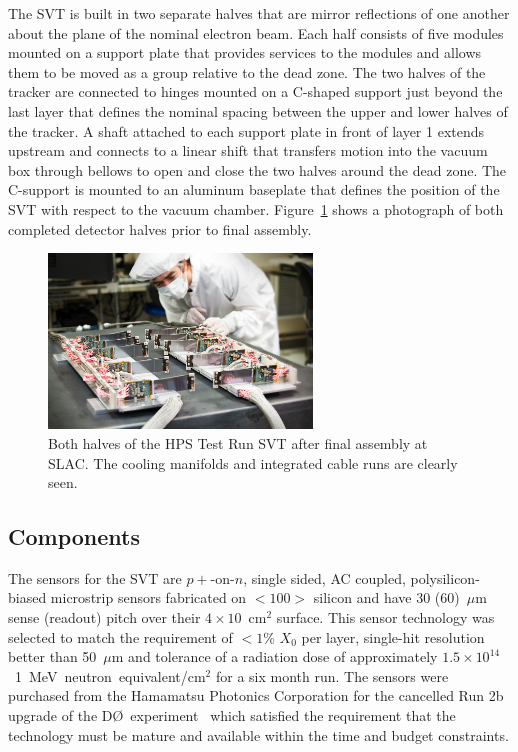 \documentclass[final,3p,times,twocolumn]{elsarticle}
\newcommand{\fluenceunit}{1~MeV~neutron~equivalent/cm\ensuremath{^2}}
\begin{document}
The SVT is built in two separate halves that are mirror reflections of one another about the plane of 
the nominal electron beam.  Each half consists of five modules mounted on a support plate that 
provides services to the modules and allows them to be moved as a group relative to the dead zone. 
The two halves of the tracker are connected to hinges mounted on a C-shaped support just beyond 
the last layer that defines the nominal spacing between the upper and lower halves of the tracker.  A 
shaft attached to each support plate in front of layer 1 extends upstream and connects to a linear shift 
that transfers motion into the vacuum box through bellows to open and close the two halves around 
the dead zone. The C-support is mounted to an aluminum baseplate that defines the position of the 
SVT with respect to the vacuum chamber. Figure~\ref{fig:tracker_halves} shows a photograph of both 
completed detector halves prior to final assembly. 
\begin{figure}[htp]
\begin{center}
    \includegraphics[width=7cm]{figures/2012-101-PHOTON-DETECTOR-001}
\caption{\small{Both halves of the HPS Test Run SVT after final assembly at SLAC.  The cooling manifolds and 
integrated cable runs are clearly seen.} }
\label{fig:tracker_halves}
\end{center}
\end{figure}

\subsection{Components}
The sensors for the SVT are $p+$-on-$n$, single sided, AC coupled, polysilicon-biased microstrip 
sensors fabricated on $<100>$ silicon and have 30 (60)~$\mu$m sense (readout) pitch over their 
$4\times10$~cm$^2$ surface. This sensor technology was selected to match the requirement of 
$<1$\% $X_0$ per layer, single-hit resolution better than 50~$\mu$m and tolerance of a radiation 
dose of approximately $1.5\times10^{14}$~\fluenceunit{} for a six month run. The sensors 
were purchased from the Hamamatsu Photonics Corporation for the cancelled 
Run 2b upgrade of the D\O~experiment~\cite{Denisov:2001aa} which satisfied the requirement that 
the technology must be mature and available within the time and budget constraints.
\end{document}
